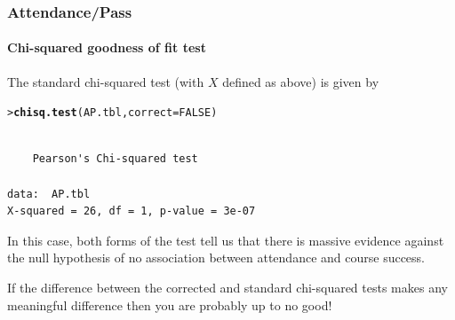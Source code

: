 \documentclass{beamer}\usepackage[]{graphicx}\usepackage[]{xcolor}
\makeatletter
\newcommand{\hlnum}[1]{\textcolor[rgb]{0.686,0.059,0.569}{#1}}%
\newcommand{\hlstd}[1]{\textcolor[rgb]{0.345,0.345,0.345}{#1}}%
\newcommand{\hlkwc}[1]{\textcolor[rgb]{0.333,0.667,0.333}{#1}}%
\newcommand{\hlkwd}[1]{\textcolor[rgb]{0.737,0.353,0.396}{\textbf{#1}}}%
\newenvironment{kframe}{%
 \def\at@end@of@kframe{}%
 \ifinner\ifhmode%
  \def\at@end@of@kframe{\end{minipage}}%
  \begin{minipage}{\columnwidth}%
 \fi\fi%
 \def\FrameCommand##1{\hskip\@totalleftmargin \hskip-\fboxsep
 \colorbox{shadecolor}{##1}\hskip-\fboxsep
     \hskip-\linewidth \hskip-\@totalleftmargin \hskip\columnwidth}%
 \MakeFramed {\advance\hsize-\width
   \@totalleftmargin\z@ \linewidth\hsize
   \@setminipage}}%
 {\par\unskip\endMakeFramed%
 \at@end@of@kframe}
\newenvironment{knitrout}{}{} %
\makeatother
\begin{document}
\begin{frame}[fragile]
\frametitle{Attendance/Pass}
\framesubtitle{Chi-squared goodness of fit test}
The standard chi-squared test (with $X$ defined as above) is given by
\begin{knitrout}\scriptsize
{}\color{fgcolor}\begin{kframe}
\begin{alltt}
\hlstd{> }\hlkwd{chisq.test}\hlstd{(AP.tbl,}\hlkwc{correct}\hlstd{=}\hlnum{FALSE}\hlstd{)}
\end{alltt}
\begin{verbatim}

	Pearson's Chi-squared test

data:  AP.tbl
X-squared = 26, df = 1, p-value = 3e-07
\end{verbatim}
\end{kframe}
\end{knitrout}

\medskip

In this case, both forms of the test tell us that there is massive evidence against
the null hypothesis of no association between attendance and course success.

\medskip

If the difference between the corrected and standard chi-squared tests makes any meaningful difference then you are probably up to no good!
\end{frame}
\end{document}
